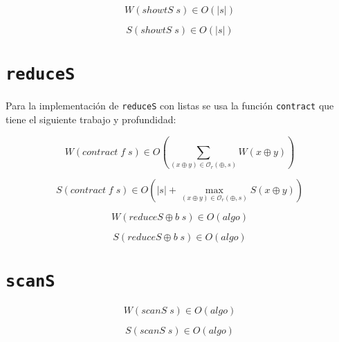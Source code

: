 \documentclass[a4paper,10pt]{article}
\begin{document}
\begin{equation*}
    W \left( showtS \; s \right) \in
    O \left( \vert s \vert \right)
\end{equation*}

\begin{equation*}
    S \left( showtS \; s \right) \in
    O \left( \vert s \vert \right)
\end{equation*}


\section*{\texttt{reduceS}}

Para la implementación de \texttt{reduceS} con listas se usa la función
\texttt{contract} que tiene el siguiente trabajo y profundidad:


\begin{equation*}
    W(contract \; f \; s)
    \in
    O \left( \sum_{(x \oplus y) \in \mathcal{O}_r(\oplus,s)} W(x \oplus y) \right)
\end{equation*}

\begin{equation*}
    S(contract \; f \; s)
    \in
    O \left( \vert s \vert + \max_{(x \oplus y) \in \mathcal{O}_r(\oplus,s)} S(x \oplus y) \right)
\end{equation*}

\begin{equation*}
    W \left( reduceS \oplus b \; s \right) \in
    O \left( algo \right)
\end{equation*}

\begin{equation*}
    S \left( reduceS \oplus b \; s \right) \in
    O \left( algo \right)
\end{equation*}

\section*{\texttt{scanS}}

\begin{equation*}
    W \left( scanS \; s \right) \in O \left( algo \right)
\end{equation*}

\begin{equation*}
    S \left( scanS \; s \right) \in O \left( algo \right)
\end{equation*}

\newpage{}

\setcounter{section}{0}
\end{document}
